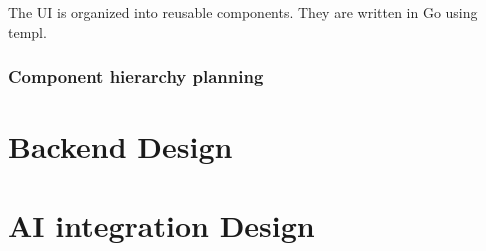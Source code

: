 The UI is organized into reusable components. They are written in Go using templ.

\subsubsection{Component hierarchy planning}

\subsubsection{}

\section{Backend Design}

\section{AI integration Design}